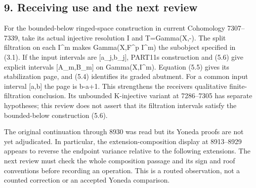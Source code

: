 \subsection{9. Receiving use and the next review}\label{proofs-8352-8772-receiving-use-and-the-next-review}

For the bounded-below ringed-space construction in current Cohomology 7307–\allowbreak{}7339,\allowbreak{} take its actual injective resolution I and T\allowbreak{}=Gamma(X,\allowbreak{}-)\allowbreak{}. The split filtration on each I\^{}m makes Gamma(X,\allowbreak{}F\textasciicircum{}p I\textasciicircum{}m)\allowbreak{} the subobject specified in (3.1)\allowbreak{}. If the input intervals are [a\_\allowbreak{}j,\allowbreak{}b\_\allowbreak{}j]\allowbreak{},\allowbreak{} PART11\textquotesingle s construction and (5.6)\allowbreak{} give explicit intervals [A\_\allowbreak{}m,\allowbreak{}B\_\allowbreak{}m]\allowbreak{} on Gamma(X,\allowbreak{}I\textasciicircum{}m)\allowbreak{}. Equation (5.5)\allowbreak{} gives its stabilization page,\allowbreak{} and (5.4)\allowbreak{} identifies its graded abutment. For a common input interval [a,\allowbreak{}b]\allowbreak{} the page is b-a\allowbreak{}+1. This strengthens the receiver\textquotesingle s qualitative finite- filtration conclusion. Its unbounded K-injective variant at 7286–\allowbreak{}7305 has separate hypotheses; this review does not assert that its filtration intervals satisfy the bounded-below construction (5.6)\allowbreak{}.

The original continuation through 8930 was read but its Yoneda proofs are not yet adjudicated. In particular,\allowbreak{} the extension-composition display at 8913–\allowbreak{}8929 appears to reverse the endpoint variance relative to the following extensions. The next review must check the whole composition passage and its sign and roof conventions before recording an operation. This is a routed observation,\allowbreak{} not a counted correction or an accepted Yoneda comparison.
